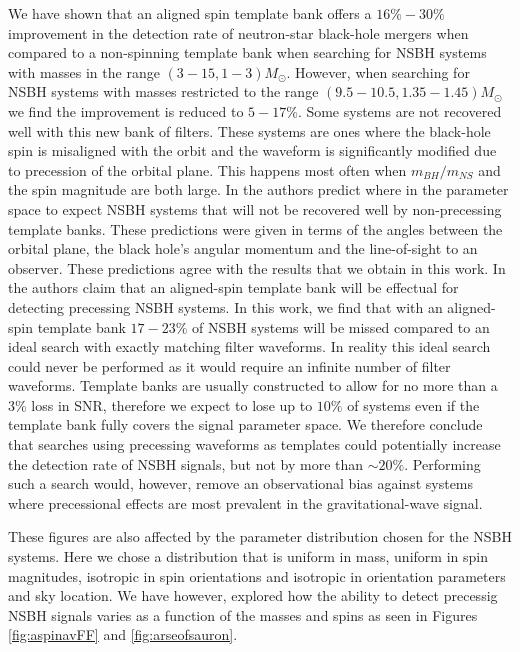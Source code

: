 We have shown that an aligned spin template bank offers a
$16\%-30\%$ improvement in the detection rate of neutron-star black-hole
mergers when compared to a non-spinning template bank when searching for 
\ac{NSBH} systems with masses in the range $(3-15,1-3)M_{\odot}$. However, when
searching for \ac{NSBH} systems with masses restricted to the range 
$(9.5-10.5,1.35-1.45)M_{\odot}$ we find the improvement is reduced to $5-17\%$.
Some systems are not recovered well with this new bank of filters. These systems
are ones where the black-hole spin is misaligned with the orbit and the waveform
is significantly modified due to precession of the orbital plane. This happens
most often when $m_{BH} / m_{NS}$ and the spin magnitude are both large. In
\cite{Brown:2012gs} the authors predict where in the parameter space to expect
\ac{NSBH} systems that will not be recovered well by non-precessing template
banks. These predictions were
given in terms of the angles between the orbital plane, the black hole's angular
momentum and the line-of-sight to an observer. These predictions agree with the
results that we obtain in this work. In \cite{Ajith:2012mn} the authors claim
that an aligned-spin template bank will be effectual for detecting precessing
\ac{NSBH} systems. In this work, we find that with an aligned-spin template
bank $17-23\%$ of \ac{NSBH} systems will be missed compared to an ideal search
with
exactly matching filter waveforms. In reality this ideal search could never
be performed as it would require an infinite number of filter waveforms.
Template banks are usually constructed to allow for no more than a 3\% loss in
\ac{SNR}, therefore we expect to lose up to $10\%$ of systems even if the
template bank fully covers the signal parameter space. We therefore conclude
that searches using precessing waveforms as templates could potentially
increase the detection rate of \ac{NSBH} signals, but not by more than $\sim
20\%$. Performing such a search would, however, remove an observational bias
against systems where precessional effects are most prevalent in the
gravitational-wave signal.

These figures are also affected by the 
parameter distribution chosen for the \ac{NSBH} systems. Here we chose a 
distribution that is uniform in mass, uniform in spin magnitudes, isotropic in 
spin orientations and isotropic in orientation parameters and sky location. We 
have however, explored how the ability to detect precessig \ac{NSBH} signals 
varies as a function of the masses and spins as seen in Figures 
\ref{fig:aspinavFF} and \ref{fig:arseofsauron}. 

